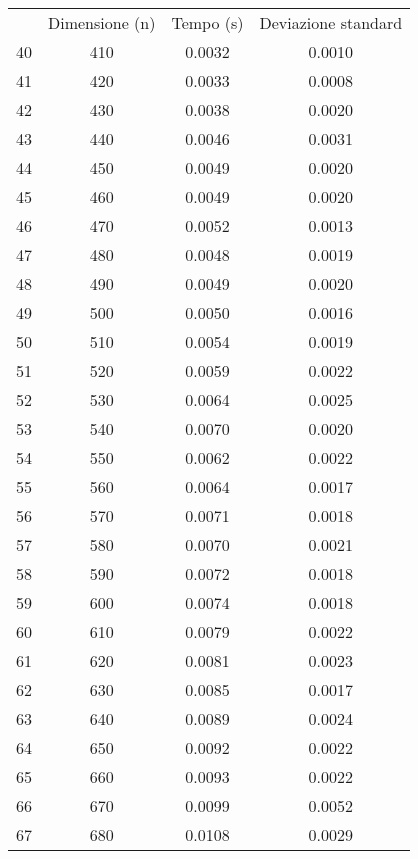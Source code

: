 \begin{table}
\centering
\begin{adjustbox}{width=1\textwidth/2}
\begin{tabular}{|c|c|c|c|}
\hline
 & Dimensione (n) & Tempo (s) & Deviazione standard \\
40 & 410 & 0.0032 & 0.0010 \\
\cline{1-4}
41 & 420 & 0.0033 & 0.0008 \\
\cline{1-4}
42 & 430 & 0.0038 & 0.0020 \\
\cline{1-4}
43 & 440 & 0.0046 & 0.0031 \\
\cline{1-4}
44 & 450 & 0.0049 & 0.0020 \\
\cline{1-4}
45 & 460 & 0.0049 & 0.0020 \\
\cline{1-4}
46 & 470 & 0.0052 & 0.0013 \\
\cline{1-4}
47 & 480 & 0.0048 & 0.0019 \\
\cline{1-4}
48 & 490 & 0.0049 & 0.0020 \\
\cline{1-4}
49 & 500 & 0.0050 & 0.0016 \\
\cline{1-4}
50 & 510 & 0.0054 & 0.0019 \\
\cline{1-4}
51 & 520 & 0.0059 & 0.0022 \\
\cline{1-4}
52 & 530 & 0.0064 & 0.0025 \\
\cline{1-4}
53 & 540 & 0.0070 & 0.0020 \\
\cline{1-4}
54 & 550 & 0.0062 & 0.0022 \\
\cline{1-4}
55 & 560 & 0.0064 & 0.0017 \\
\cline{1-4}
56 & 570 & 0.0071 & 0.0018 \\
\cline{1-4}
57 & 580 & 0.0070 & 0.0021 \\
\cline{1-4}
58 & 590 & 0.0072 & 0.0018 \\
\cline{1-4}
59 & 600 & 0.0074 & 0.0018 \\
\cline{1-4}
60 & 610 & 0.0079 & 0.0022 \\
\cline{1-4}
61 & 620 & 0.0081 & 0.0023 \\
\cline{1-4}
62 & 630 & 0.0085 & 0.0017 \\
\cline{1-4}
63 & 640 & 0.0089 & 0.0024 \\
\cline{1-4}
64 & 650 & 0.0092 & 0.0022 \\
\cline{1-4}
65 & 660 & 0.0093 & 0.0022 \\
\cline{1-4}
66 & 670 & 0.0099 & 0.0052 \\
\cline{1-4}
67 & 680 & 0.0108 & 0.0029 \\
\cline{1-4}

\end{tabular}
\end{adjustbox}
\end{table}
